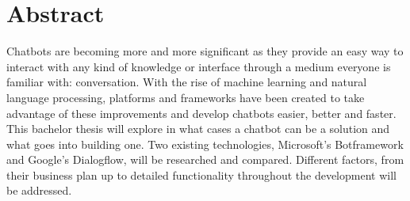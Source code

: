 \chapter*{Abstract}

Chatbots are becoming more and more significant as they provide an easy way to interact with any kind of knowledge or interface through a medium everyone is familiar with: conversation. With the rise of machine learning and natural language processing, platforms and frameworks have been created to take advantage of these improvements and develop chatbots easier, better and faster. This bachelor thesis will explore in what cases a chatbot can be a solution and what goes into building one. Two existing technologies, Microsoft's Botframework and Google's Dialogflow, will be researched and compared. Different factors, from their business plan up to detailed functionality throughout the development will be addressed.